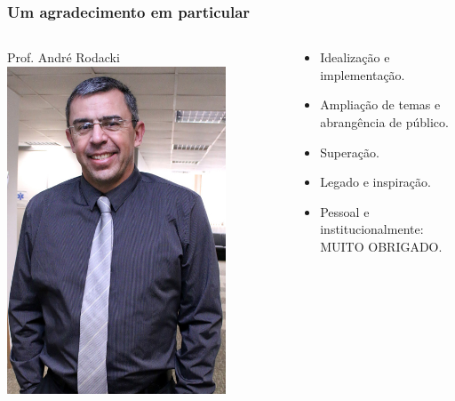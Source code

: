 \documentclass[handout,serif, professionalfont, usenames, dvipsnames, aspectratio = 169]{beamer}\usepackage[]{graphicx}\usepackage[]{color}
\begin{document}
\begin{frame}
\frametitle{Um agradecimento em particular}

\begin{columns}
\begin{column}{0.35\textwidth}
\begin{center}
\large{Prof. André Rodacki}
\includegraphics[width=0.8\textwidth]{pics/Rodacki}
\end{center}
\end{column}
\begin{column}{0.65\textwidth}
\begin{itemize}
\item<1-> Idealização e implementação.
\item<1-> Ampliação de temas e abrangência de público.
\item<1-> Superação.
\item<1-> Legado e inspiração.
\item<2-> Pessoal e institucionalmente: MUITO OBRIGADO.
\end{itemize}
\end{column}
\end{columns}
\end{frame}
\end{document}
